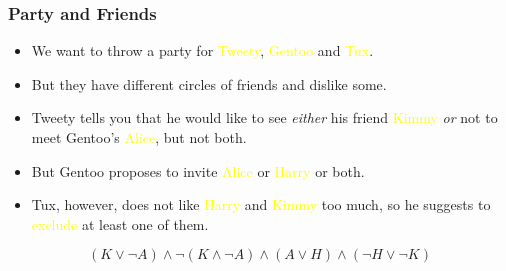 \documentclass[UTF8,11pt,colorlinks,compress,openany]{beamer}%
\begin{document}
\begin{frame}\frametitle{Party and Friends}
	\begin{problem}
		\begin{itemize}
			\item We want to throw a party for \textcolor{yellow}{Tweety}, \textcolor{yellow}{Gentoo} and \textcolor{yellow}{Tux}.
			\item But they have different circles of friends and dislike some.
			\item Tweety tells you that he would like to see \emph{either} his friend \textcolor{yellow}{Kimmy} \emph{or} not to meet Gentoo's \textcolor{yellow}{Alice}, but not both.
			\item But Gentoo proposes to invite \textcolor{yellow}{Alice} or \textcolor{yellow}{Harry} or both.
			\item Tux, however, does not like \textcolor{yellow}{Harry} and \textcolor{yellow}{Kimmy} too much, so he suggests to \textcolor{yellow}{exclude} at least one of them.
		\end{itemize}
	\end{problem}\pause
	\begin{solution}
		\[(K\vee\neg A)\wedge\neg(K\wedge\neg A)\wedge(A\vee H)\wedge(\neg H\vee\neg K)\]
	\end{solution}
\end{frame}
\end{document}
